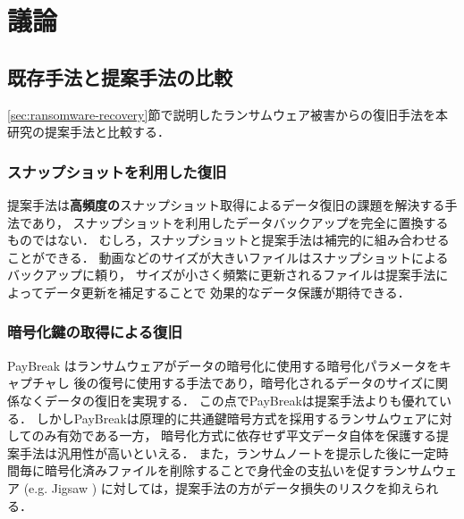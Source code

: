 \chapter{議論}
\section{既存手法と提案手法の比較}
\ref{sec:ransomware-recovery}節で説明したランサムウェア被害からの復旧手法を本研究の提案手法と比較する．
\subsection{スナップショットを利用した復旧}
提案手法は\textbf{高頻度の}スナップショット取得によるデータ復旧の課題を解決する手法であり，
スナップショットを利用したデータバックアップを完全に置換するものではない．
むしろ，スナップショットと提案手法は補完的に組み合わせることができる．
動画などのサイズが大きいファイルはスナップショットによるバックアップに頼り，
サイズが小さく頻繁に更新されるファイルは提案手法によってデータ更新を補足することで
効果的なデータ保護が期待できる．

\subsection{暗号化鍵の取得による復旧}
PayBreak \cite{kolodenker2017paybreak}はランサムウェアがデータの暗号化に使用する暗号化パラメータをキャプチャし
後の復号に使用する手法であり，暗号化されるデータのサイズに関係なくデータの復旧を実現する．
この点でPayBreakは提案手法よりも優れている．
しかしPayBreakは原理的に共通鍵暗号方式を採用するランサムウェアに対してのみ有効である一方，
暗号化方式に依存せず平文データ自体を保護する提案手法は汎用性が高いといえる．
また，ランサムノートを提示した後に一定時間毎に暗号化済みファイルを削除することで身代金の支払いを促すランサムウェア (e.g. Jigsaw \cite{byrne2017jigsaw})
に対しては，提案手法の方がデータ損失のリスクを抑えられる．
